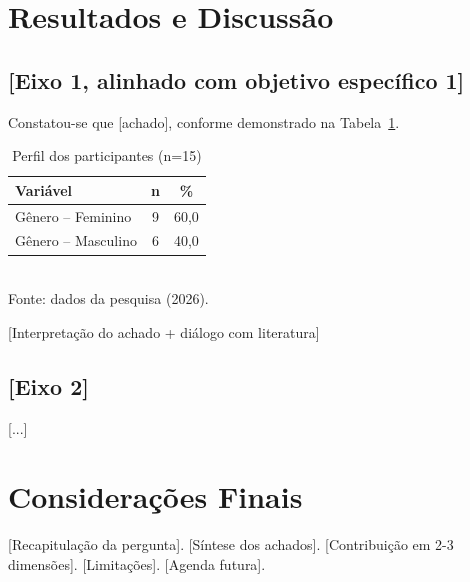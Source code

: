 \documentclass[12pt,a4paper]{article}
\begin{document}
\section*{Resultados e Discussão}

\subsection*{[Eixo 1, alinhado com objetivo específico 1]}

Constatou-se que [achado], conforme demonstrado na Tabela~\ref{tab:perfil}.

\begin{table}[htbp]
\centering
\caption{Perfil dos participantes (n=15)}
\label{tab:perfil}
\begin{tabular}{lcc}
\toprule
\textbf{Variável} & \textbf{n} & \textbf{\%} \\
\midrule
Gênero -- Feminino & 9 & 60{,}0 \\
Gênero -- Masculino & 6 & 40{,}0 \\
\bottomrule
\end{tabular}
\\\smallskip
\footnotesize Fonte: dados da pesquisa (2026).
\end{table}

[Interpretação do achado + diálogo com literatura]

\subsection*{[Eixo 2]}

[...]

\section*{Considerações Finais}

[Recapitulação da pergunta]. [Síntese dos achados]. [Contribuição
em 2-3 dimensões]. [Limitações]. [Agenda futura].

\renewcommand{\refname}{Referências}

\end{document}
